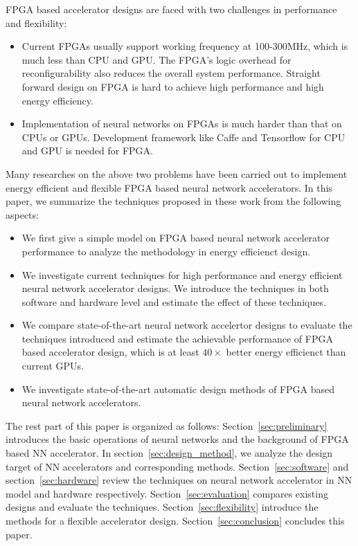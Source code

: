 FPGA based accelerator designs are faced with two challenges in performance and flexibility:
\begin{itemize}
    \item Current FPGAs usually support working frequency at 100-300MHz, which is much less than CPU and GPU. The FPGA's logic overhead for reconfigurability also reduces the overall system performance. Straight forward design on FPGA is hard to achieve high performance and high energy efficiency.
    \item Implementation of neural networks on FPGAs is much harder than that on CPUs or GPUs. Development framework like Caffe and Tensorflow for CPU and GPU is needed for FPGA.
\end{itemize}
 
Many researches on the above two problems have been carried out to implement energy efficient and flexible FPGA based neural network accelerators. In this paper, we summarize the techniques proposed in these work from the following aspects:
\begin{itemize}
    \item We first give a simple model on FPGA based neural network accelerator performance to analyze the methodology in energy efficienct design.
    \item We investigate current techniques for high performance and energy efficient neural network accelerator designs. We introduce the techniques in both software and hardware level and estimate the effect of these techniques.
    \item We compare state-of-the-art neural network accelertor designs to evaluate the techniques introduced and estimate the achievable performance of FPGA based accelerator design, which is at least $40\times$ better energy efficienct than current GPUs.
    \item We investigate state-of-the-art automatic design methods of FPGA based neural network accelerators. 
\end{itemize}

The rest part of this paper is organized as follows: Section~\ref{sec:preliminary} introduces the basic operations of neural networks and the background of FPGA based NN accelerator. In section~\ref{sec:design_method}, we analyze the design target of NN accelerators and corresponding methods. Section~\ref{sec:software} and section~\ref{sec:hardware} review the techniques on neural network accelerator in NN model and hardware respectively. Section~\ref{sec:evaluation} compares existing designs and evaluate the techniques. Section~\ref{sec:flexibility} introduce the methods for a flexible accelerator design. Section~\ref{sec:conclusion} concludes this paper.